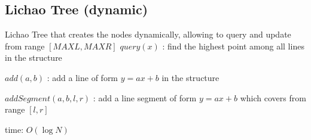 \subsection{Lichao Tree (dynamic)}

Lichao Tree that creates the nodes dynamically, allowing to query and update from range $[MAXL, MAXR]$
$query(x)$ : find the highest point among all lines in the structure

$add(a, b)$ : add a line of form $y = ax + b$ in the structure

$addSegment(a, b, l, r)$ : add a line segment of form $y = ax + b$ which covers from range $[l, r]$

time: $O(\log{N})$
